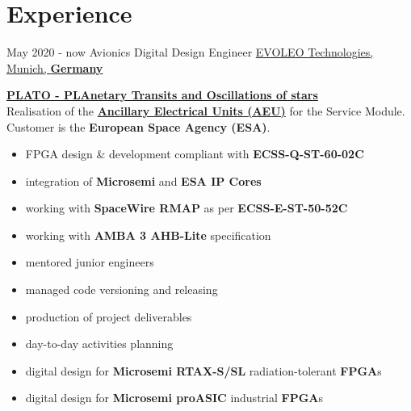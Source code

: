 \documentclass[letterpaper]{twentysecondcv} %
\begin{document}
\makeprofile %

%
%
\section{Experience}

\begin{twenty} %
    \twentyitem
    	{May 2020 -}
		{now}
        {Avionics Digital Design Engineer}
        {\href{http://evoleotech.com/company/}{EVOLEO Technologies, Munich, \textbf{Germany}}}
        {}
        {
            \textbf{\href{https://sci.esa.int/web/plato}{PLATO - PLAnetary Transits and Oscillations of stars}}\\
            Realisation of the
            \href{https://platomission.com/2018/05/15/ancillary-electrical-units-aeu-2/}{\textbf{Ancillary
            Electrical Units (AEU)}} for the Service Module. Customer is the
            \textbf{European Space Agency (ESA)}.
            \vspace{1 mm}
            \begin{itemize}
                \item FPGA design \& development compliant with \textbf{ECSS-Q-ST-60-02C}
                \item integration of \textbf{Microsemi} and \textbf{ESA IP Cores}
                \item working with \textbf{SpaceWire RMAP} as per \textbf{ECSS-E-ST-50-52C}
                \item working with \textbf{AMBA 3 AHB-Lite} specification
                \item mentored junior engineers
                \item managed code versioning and releasing
                \item production of project deliverables
                \item day-to-day activities planning
                \item digital design for \textbf{Microsemi RTAX-S/SL} radiation-tolerant \textbf{FPGA}s
                \item digital design for \textbf{Microsemi proASIC} industrial \textbf{FPGA}s
            \end{itemize}

}
\end{twenty}
\end{document}
